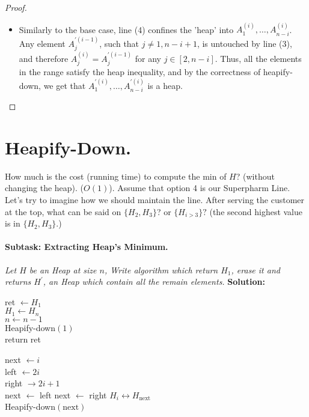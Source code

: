 \begin{proof}
\begin{enumerate}
\begin{itemize}
       \item Similarly to the base case, line (4) confines the 'heap' into $A^{(i)}_{1}, \ldots, A^{(i)}_{n-i}$. Any element $A^{\prime (i-1)}_{j}$, such that $j \neq 1, n-i+1$, is untouched by line (3), and therefore $A^{(i)}_{j} = A^{\prime (i-1)}_{j}$ for any $j \in [2, n-i]$. Thus, all the elements in the range satisfy the heap inequality, and by the correctness of heapify-down, we get that $A^{\prime (i)}_{1}, \ldots, A^{\prime (i)}_{n-i}$ is a heap.

    \end{itemize}
\end{enumerate}
\end{proof}


\section{ Heapify-Down. }

How much is the cost (running time) to compute the min of $H$? (without changing the heap). ($O\left( 1 \right)$). Assume that option 4 is our Superpharm Line. Let's try to imagine how we should maintain the line. After serving the customer at the top, what can be said on $ \{ H_{2}, H_{3}\}$? or $\{H_{i>3}\}?$ (the second highest value is in $\{H_{2}, H_{3} \}$.)   
\paragraph{Subtask: Extracting Heap's Minimum.} \textit{Let $H$ be an Heap at size $n$, Write algorithm which return $H_1$, erase it and returns $H^\prime$, an Heap which contain all the remain elements.} 
\textbf{Solution:} 

\begin{algorithm}[H]
ret $\leftarrow H_{1} $ \\
$ H_{1} \leftarrow H_{n} $  \\
$ n \leftarrow n -1 $ \\
Heapify-down$\left( 1 \right)$ \\
return ret  
\end{algorithm}


\begin{algorithm}[H]
next  $\leftarrow i  $ \\
left  $\leftarrow 2i $ \\
right $\rightarrow 2i +1 $ \\ 
 {
  next $\leftarrow$ left 
}
 {
  next $\leftarrow$  right
}
 {
  $ H_{i} \leftrightarrow H_{\text{next}} $ \\ 
  Heapify-down$\left( \text{next}  \right)$
}
\end{algorithm}


